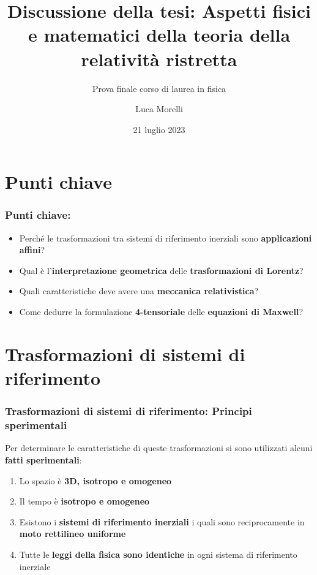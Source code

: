 \documentclass{beamer}
\title{Discussione della tesi: Aspetti fisici e matematici della teoria della relatività ristretta}
\subtitle{Prova finale corso di laurea in fisica}
\author{Luca Morelli}
\date{21 luglio 2023}
\begin{document}
\begin{frame}
\titlepage
\end{frame}

\section*{Punti chiave}
\begin{frame}
    \frametitle{Punti chiave:}
    \begin{itemize}
        \item Perché le trasformazioni tra sistemi di riferimento inerziali sono \textbf{applicazioni affini}?
        \item Qual è l'\textbf{interpretazione geometrica} delle \textbf{trasformazioni di Lorentz}?
        \item Quali caratteristiche deve avere una \textbf{meccanica relativistica}?
        \item Come dedurre la formulazione \textbf{4-tensoriale} delle \textbf{equazioni di Maxwell}?
    \end{itemize}
\end{frame}

\section*{Trasformazioni di sistemi di riferimento}
\begin{frame}
    \frametitle{Trasformazioni di sistemi di riferimento: Principi sperimentali}
    Per determinare le caratteristiche di queste trasformazioni si sono utilizzati alcuni \textbf{fatti sperimentali}:
    \begin{enumerate}
        \item Lo spazio è \textbf{3D, isotropo e omogeneo}
        \item Il tempo è \textbf{isotropo e omogeneo}
        \item Esistono i \textbf{sistemi di riferimento inerziali} i quali sono reciprocamente in \textbf{moto rettilineo uniforme }
        \item Tutte le \textbf{leggi della fisica sono identiche} in ogni sistema di riferimento inerziale
    \end{enumerate}
\end{frame}
\end{document}
